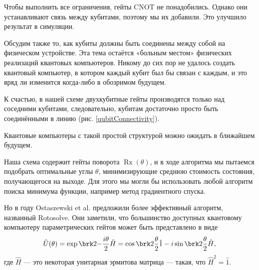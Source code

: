 
Чтобы выполнить все ограничения, гейты CNOT не понадобились. Однако они устанавливают связь между кубитами, поэтому мы их добавили. Это улучшило результат в симуляции.

Обсудим также то, как кубиты должны быть соединены между собой на физическом устройстве. 
Эта тема остаётся «больным местом» 
физических реализаций квантовых компьютеров. Никому до сих пор не удалось создать квантовый компьютер, в котором каждый кубит был бы связан с каждым, и это вряд ли изменится когда-либо в обозримом будущем.

К счастью, в нашей схеме двухкубитные гейты производятся только над соседними кубитами, следовательно, кубитам достаточно просто быть соединёнными в линию (рис. \ref{qubitConnectivity}).


Квантовые компьютеры с такой простой структурой можно ожидать в ближайшем будущем.



Наша схема содержит гейты поворота $\operatorname{Rx}(\theta)$, и в ходе алгоритма мы пытаемся подобрать оптимальные углы $\theta$, минимизирующие среднюю стоимость состояния, получающегося на выходе. Для этого мы могли бы использовать любой алгоритм поиска минимума функции, например метод градиентного спуска.

Но в  году Ostaszewski et al. \cite{rotosolve} предложили более эффективный алгоритм, названный Rotosolve. Они заметили, что большинство доступных квантовому компьютеру параметрических гейтов может быть представлено в виде
\begin{equation}
\hat U(\theta) 
= \exp\brk2{-\frac{i \theta}{2} \hat H}
= \cos\brk2{\frac{\theta}{2}} \hat 1 - i \sin\brk2{\frac{\theta}{2}} \hat H,
\label{eq:exp}
\end{equation}
где $\hat H$ --- это некоторая унитарная эрмитова матрица --- такая, что $\hat H^2 = \hat 1.$

